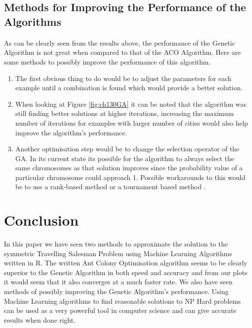 \documentclass[11pt,a4paper,final]{article}
\begin{document}
	\subsection{Methods for Improving the Performance of the Algorithms}
	\paragraph{ }As can be clearly seen from the results above, the performance of the Genetic Algorithm is not great when compared to that of the ACO Algorithm. Here are some methods to possibly improve the performance of this algorithm.
	\begin{enumerate}
		\item The first obvious thing to do would be to adjust the parameters for each example until a combination is found which would provide a better solution.
		\item When looking at Figure \ref{fig:ch130GA} it can be noted that the algorithm was still finding better solutions at higher iterations, increasing the maximum number of iterations for examples with  larger number of cities would also help improve the algorithm's performance.
		\item Another optimisation step would be to change the selection operator of the GA. In its current state its possible for the algorithm to always select the same chromosomes as that solution improves since the probability value of a particular chromosome could approach 1. Possible workarounds to this would be to use a rank-based method \cite{rank} or a tournament based method \cite{tournament}.
	\end{enumerate}
	
	\section{Conclusion}
	\label{Conc}
	\paragraph{ }In this paper we have seen two methods to approximate the solution to the symmetric Travelling Salesman Problem using Machine Learning Algorithms written in R. The written Ant Colony Optimisation algorithm seems to be clearly superior to the Genetic Algorithm in both speed and accuracy and from our plots it would seem that it also converges at a much faster rate. We also have seen methods of possibly improving the Genetic Algorithm's performance. Using Machine Learning algorithms to find reasonable solutions to NP Hard problems can be used as a very powerful tool in computer science and can give accurate results when done right. 
	
\end{document}
